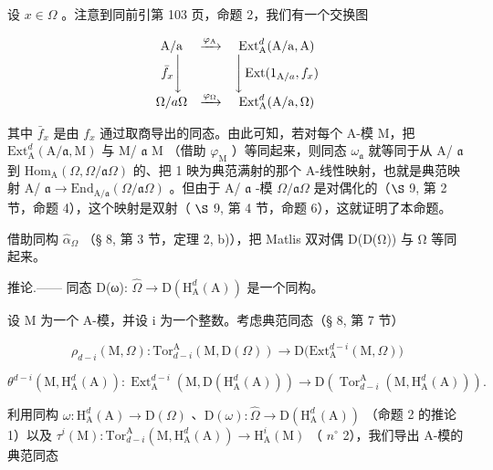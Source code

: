 设 \(x \in \Omega\) 。注意到同前引第 103 页，命题 2，我们有一个交换图

\[
\begin{array}{c c c} \mathrm{A/a} & \xrightarrow {\varphi_ {\mathrm{A}}} & \operatorname{Ext} _ {\mathrm{A}} ^ {d} (\mathrm{A/a}, \mathrm{A}) \\ \bar {f} _ {x} \Bigg \downarrow & & \Bigg \downarrow \operatorname{Ext} (1 _ {\mathrm{A} / a}, f _ {x}) \\ \Omega / a \Omega & \xrightarrow {\varphi_ {\Omega}} & \operatorname{Ext} _ {\mathrm{A}} ^ {d} (\mathrm{A/a}, \Omega) \end{array}
\]

其中 \(\bar{f}_x\) 是由 \(f_x\) 通过取商导出的同态。由此可知，若对每个 A-模 M，把 \(\mathrm{Ext}_{\mathrm{A}}^{d}(\mathrm{A}/\mathfrak{a},\mathrm{M})\) 与 M/ \(\mathfrak{a}\) M （借助 \(\varphi_{\mathrm{M}}\) ）等同起来，则同态 \(\omega_{\mathfrak{a}}\) 就等同于从 A/ \(\mathfrak{a}\) 到 \(\mathrm{Hom}_{\mathrm{A}}(\Omega,\Omega/\mathfrak{a}\Omega)\) 的、把 1 映为典范满射的那个 A-线性映射，也就是典范映射 A/ \(\mathfrak{a}\longrightarrow\mathrm{End}_{\mathrm{A}/\mathfrak{a}}(\Omega/\mathfrak{a}\Omega)\) 。但由于 A/ \(\mathfrak{a}\) -模 \(\Omega/\mathfrak{a}\Omega\) 是对偶化的（\(\S\) 9, 第 2 节，命题 4），这个映射是双射（ \(\S\) 9, 第 4 节，命题 6），这就证明了本命题。

借助同构 \(\widehat{\alpha}_{\Omega}\) （§ 8, 第 3 节，定理 2, b)），把 Matlis 双对偶 D(D(Ω)) 与 Ω 等同起来。

推论.—— 同态 D(ω): \(\widehat{\Omega} \rightarrow \mathrm{D}(\mathrm{H}_{\mathrm{A}}^{d}(\mathrm{A}))\) 是一个同构。

设 M 为一个 A-模，并设 i 为一个整数。考虑典范同态（§ 8, 第 7 节）

\[
\rho_ {d - i} (\mathrm{M}, \Omega): \mathrm{Tor} _ {d - i} ^ {\mathrm{A}} (\mathrm{M}, \mathrm{D} (\Omega)) \longrightarrow \mathrm{D} \big (\mathrm{Ext} _ {\mathrm{A}} ^ {d - i} (\mathrm{M}, \Omega) \big)
\]

\[
\theta^ {d - i} (\mathrm{M}, \mathrm{H} _ {\mathrm{A}} ^ {d} (\mathrm{A})): \operatorname{Ext} _ {\mathrm{A}} ^ {d - i} \left(\mathrm{M}, \mathrm{D} \left(\mathrm{H} _ {\mathrm{A}} ^ {d} (\mathrm{A})\right)\right) \longrightarrow \mathrm{D} \left(\operatorname{Tor} _ {d - i} ^ {\mathrm{A}} \left(\mathrm{M}, \mathrm{H} _ {\mathrm{A}} ^ {d} (\mathrm{A})\right)\right).
\]

利用同构 \(\omega : \mathrm{H}_{\mathrm{A}}^{d}(\mathrm{A}) \to \mathrm{D}(\Omega)\) 、\(\mathrm{D}(\omega) : \widehat{\Omega} \to \mathrm{D}(\mathrm{H}_{\mathrm{A}}^{d}(\mathrm{A}))\) （命题 2 的推论 1）以及 \(\tau^{i}(\mathrm{M}) : \mathrm{Tor}_{d-i}^{\mathrm{A}}(\mathrm{M}, \mathrm{H}_{\mathrm{A}}^{d}(\mathrm{A})) \longrightarrow \mathrm{H}_{\mathrm{A}}^{i}(\mathrm{M})\) （ \(n^{\circ}\) 2），我们导出 A-模的典范同态

